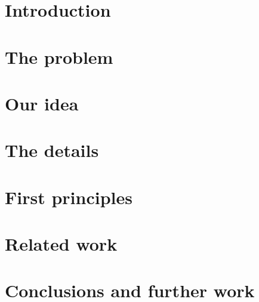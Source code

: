 \section{Introduction}


\section{The problem}


\section{Our idea}


\section{The details}


\section{First principles}
\label{principles}


\section{Related work}
\label{related}


\section{Conclusions and further work}

